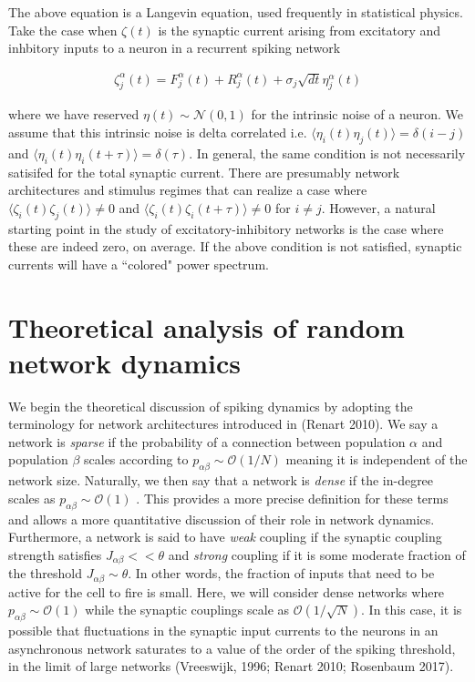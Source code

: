 \documentclass{ucetd}
\begin{document}
The above equation is a Langevin equation, used frequently in statistical physics. Take the case when $\zeta(t)$ is  the synaptic current arising from excitatory and inhbitory inputs to a neuron in a recurrent spiking network

\begin{align}
\zeta_{j}^{\alpha}(t) = F_{j}^{\alpha}(t) + R_{j}^{\alpha}(t) + \sigma_{j}\sqrt{dt}\eta_{j}^{\alpha}(t)
\end{align}

where we have reserved $\eta(t) \sim \mathcal{N}(0,1)$ for the intrinsic noise of a neuron. We assume that this intrinsic noise is delta correlated i.e. $\langle \eta_{i}(t)\eta_{j}(t)\rangle = \delta(i-j)$ and $\langle \eta_{i}(t)\eta_{i}(t+\tau)\rangle = \delta(\tau)$. In general, the same condition is not necessarily satisifed for the total synaptic current. There are presumably network architectures and stimulus regimes that can realize a case where $\langle \zeta_{i}(t)\zeta_{j}(t)\rangle \neq 0$ and $\langle \zeta_{i}(t)\zeta_{i}(t+\tau)\rangle \neq 0$ for $i \neq j$. However, a natural starting point in the study of excitatory-inhibitory networks is the case where these are indeed zero, on average. If the above condition is not satisfied, synaptic currents will have a ``colored" power spectrum. 

\section{Theoretical analysis of random network dynamics}

We begin the theoretical discussion of spiking dynamics by adopting the terminology for network architectures introduced in (Renart 2010). We say a network is \emph{sparse} if the probability of a connection between population $\alpha$ and population $\beta$ scales according to $p_{\alpha\beta} \sim \mathcal{O}(1/N)$ meaning it is independent of the network size. Naturally, we then say that a network is \emph{dense} if the in-degree scales as $p_{\alpha\beta} \sim \mathcal{O}(1)$ . This provides a more precise definition for these terms and allows a more quantitative discussion of their role in network dynamics. Furthermore, a network is said to have \emph{weak} coupling if the synaptic coupling strength satisfies $J_{\alpha\beta} << \theta$ and \emph{strong} coupling if it is some moderate fraction of the threshold $J_{\alpha\beta} \sim \theta$. In other words, the fraction of inputs that need to be active for the cell to fire is small.  Here, we will consider dense networks where $p_{\alpha\beta} \sim \mathcal{O}(1)$ while the synaptic couplings scale as $\mathcal{O}(1/\sqrt{N})$. In this case, it is possible that fluctuations in the synaptic input currents to the neurons in an asynchronous network saturates to a value of the order of the spiking threshold, in the limit of large networks (Vreeswijk, 1996; Renart 2010; Rosenbaum 2017).
\end{document}

